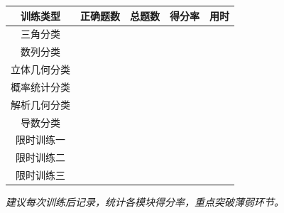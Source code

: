 \begin{center}
\begin{tabular}{c|c|c|c|c}
\textbf{训练类型} & \textbf{正确题数} & \textbf{总题数} & \textbf{得分率} & \textbf{用时} \\ \hline
三角分类 & & & & \\
数列分类 & & & & \\
立体几何分类 & & & & \\
概率统计分类 & & & & \\
解析几何分类 & & & & \\
导数分类 & & & & \\
限时训练一 & & & & \\
限时训练二 & & & & \\
限时训练三 & & & & \\
\end{tabular}
\end{center}

\textit{建议每次训练后记录，统计各模块得分率，重点突破薄弱环节。}
